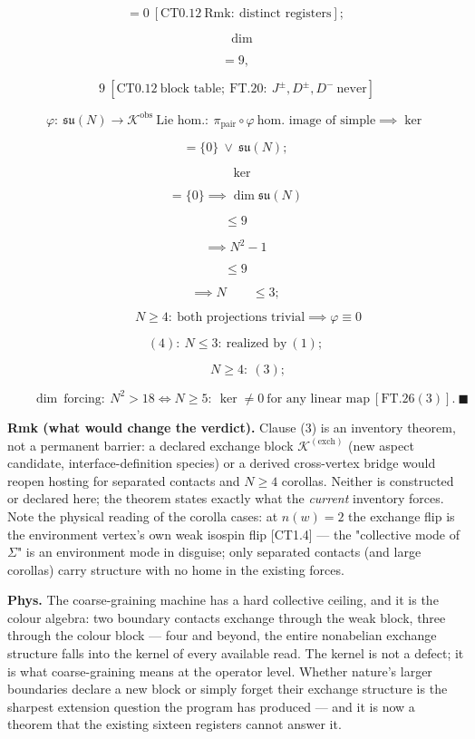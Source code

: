 \begin{theorem}
\[
= 0\ [\mathrm{CT0.12}\ \mathrm{Rmk}:\ \text{distinct registers}];
\]

\[
\quad\dim
\]

\[
= 9,
\]

\[
\ 9\ [\mathrm{CT0.12}\ \text{block table};\ \mathrm{FT.20}:\ J^\pm,D^\pm,D^-\ \text{never}]
\]

\[
\varphi:\ \mathfrak{su}(N)\to\mathcal K^{\mathrm{obs}}\ \text{Lie hom.}:\ \pi_{\mathrm{pair}}\circ\varphi\ \text{hom. image of simple}\implies\ker
\]

\[
= \{0\}\ \vee\ \mathfrak{su}(N);
\]

\[
\quad\ker
\]

\[
= \{0\}\implies\dim\mathfrak{su}(N)
\]

\[
\le 9
\]

\[
\implies N^2-1
\]

\[
\le 9
\]

\[
\implies N\qquad \le 3;
\]

\[
\qquad N\ge4:\ \text{both projections trivial}\implies\varphi\equiv0
\]

\[
(4):\ N\le3:\ \text{realized by}\ (1);
\]

\[
\qquad N\ge4:\ (3);
\]

\[
\qquad \dim\ \text{forcing}:\ N^2>18\iff N\ge5:\ \ker\ne0\ \text{for any linear map}\ [\mathrm{FT.26}(3)].\ \blacksquare
\]

\textbf{Rmk (what would change the verdict).} Clause (3) is an inventory theorem, not a permanent barrier: a declared exchange block $\mathcal K^{(\mathrm{exch})}$ (new aspect candidate, interface-definition species) or a derived cross-vertex bridge would reopen hosting for separated contacts and $N\ge4$ corollas. Neither is constructed or declared here; the theorem states exactly what the \textit{current} inventory forces. Note the physical reading of the corolla cases: at $n(w)=2$ the exchange flip is the environment vertex's own weak isospin flip [CT1.4] — the "collective mode of $\Sigma$" is an environment mode in disguise; only separated contacts (and large corollas) carry structure with no home in the existing forces.

\textbf{Phys.} The coarse-graining machine has a hard collective ceiling, and it is the colour algebra: two boundary contacts exchange through the weak block, three through the colour block — four and beyond, the entire nonabelian exchange structure falls into the kernel of every available read. The kernel is not a defect; it is what coarse-graining means at the operator level. Whether nature's larger boundaries declare a new block or simply forget their exchange structure is the sharpest extension question the program has produced — and it is now a theorem that the existing sixteen registers cannot answer it.


\end{theorem}
